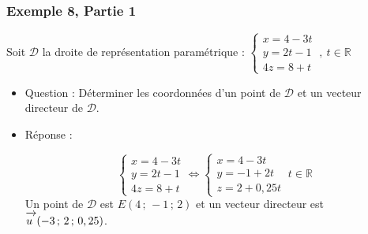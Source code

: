 \documentclass[xcolor=svgnames,t,final]{beamer}
\newcommand{\R}{\mathbb{R}}
\newcommand{\coordesp}[3]{(#1\, ;\, #2\, ;\, #3)}
\newcommand{\vect}[1]{\mathchoice%
{\overrightarrow{\displaystyle\mathstrut#1\,\,}}%
{\overrightarrow{\textstyle\mathstrut#1\,\,}}%
{\overrightarrow{\scriptstyle\mathstrut#1\,\,}}%
{\overrightarrow{\scriptscriptstyle\mathstrut#1\,\,}}}
\begin{document}
\begin{frame}

\label{exemple8}

\frametitle{Exemple 8, Partie 1}

Soit $\mathcal{D}$ la droite de représentation paramétrique : $\left\{\begin{array}{l} x=4-3t \\ y=2t-1 \\ 4z=8+t \end{array} \right.\ , \ t\in\R$


\begin{itemize}
 \item {\color{blue} Question :  Déterminer les coordonnées d'un point de $\mathcal{D}$ et un vecteur directeur de $\mathcal{D}$.
}
\pause \item {\color{red} Réponse :  

$$\left\{\begin{array}{l} x=4-3t \\ y=2t-1 \\ 4z=8+t \end{array} \right. \Leftrightarrow  \left\{\begin{array}{l} x=4-3t \\ y=-1+2t \\ z=2+0,25t \end{array} \right. \ t\in\R $$
Un point de $\mathcal{D}$ est $E\coordesp{4}{-1}{2}$ et un vecteur directeur est $\vect{u}\coordesp{-3}{2}{0,25}$.
}

\end{itemize}



\end{frame}
\end{document}
